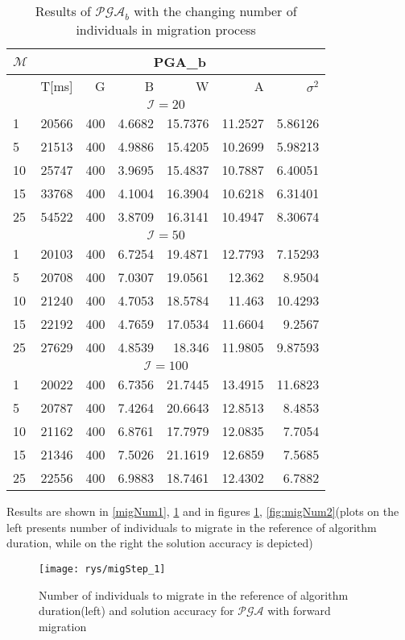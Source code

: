 \begin{table}[!htpb]
	\label{migNum2}
	\caption{Results of $\mathcal{PGA}_b$ with the changing
	number of individuals in migration process}
	\centering
	\begin{tabular}{l||r|r|r|r|r|r|}
        $\mathcal{M}$ & \multicolumn{6}{c|}{PGA\_b} \\ \hline
		          &T[ms]&G& B&W&A&$\sigma^2$ \\ \hline
				  \multicolumn{7}{c|}{$\mathcal{I}=20$}\\ \hline
1&20566&400&4.6682&15.7376&11.2527&5.86126\\ \hline
5&21513&400&4.9886&15.4205&10.2699&5.98213\\ \hline
10&25747&400&3.9695&15.4837&10.7887&6.40051\\ \hline
15&33768&400&4.1004&16.3904&10.6218&6.31401\\ \hline
25&54522&400&3.8709&16.3141&10.4947&8.30674\\ \hline
				  \multicolumn{7}{c|}{$\mathcal{I}=50$}\\ \hline
1&20103&400&6.7254&19.4871&12.7793&7.15293\\ \hline
5&20708&400&7.0307&19.0561&12.362&8.9504\\ \hline
10&21240&400&4.7053&18.5784&11.463&10.4293\\ \hline
15&22192&400&4.7659&17.0534&11.6604&9.2567\\ \hline
25&27629&400&4.8539&18.346&11.9805&9.87593\\ \hline 
				  \multicolumn{7}{c|}{$\mathcal{I}=100$}\\ \hline
1&20022&400&6.7356&21.7445&13.4915&11.6823\\ \hline
5&20787&400&7.4264&20.6643&12.8513&8.4853\\ \hline
10&21162&400&6.8761&17.7979&12.0835&7.7054\\ \hline
15&21346&400&7.5026&21.1619&12.6859&7.5685\\ \hline
25&22556&400&6.9883&18.7461&12.4302&6.7882\\ \hline 
	\end{tabular}
\end{table}

Results are shown in \ref{migNum1}, \ref{migNum2} and in figures
\ref{fig:migNum1}, \ref{fig:migNum2}(plots on the left presents number of individuals 
to migrate in the reference of algorithm duration, while on the right the solution accuracy
is depicted) 
	\begin{figure}[!htpb]
		\begin{center}
			\texttt{[image: rys/migStep\_1]}
		\end{center}
	\caption{Number of individuals to migrate in the reference of algorithm
	duration(left) and solution
	accuracy for $\mathcal{PGA}$ with forward migration}
		\label{fig:migNum1}
	\end{figure}


